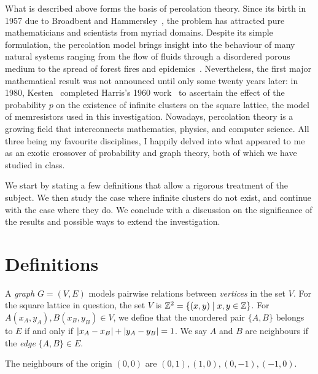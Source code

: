 \documentclass[a4paper, 12pt]{article}
\begin{document}
What is described above forms the basis of percolation theory. Since its birth in 1957 due to Broadbent and Hammersley~\autocite*[693]{broadbent_hammersley_1957}, the problem has attracted pure mathematicians and scientists from myriad domains. Despite its simple formulation, the percolation model brings insight into the behaviour of many natural systems ranging from the flow of fluids through a disordered porous medium to the spread of forest fires and epidemics~\autocite[60]{gennes_2000}. Nevertheless, the first major mathematical result was not announced until only some twenty years later: in 1980, Kesten~\autocite*[41]{kesten_1980} completed Harris's 1960 work~\autocite*[13]{harris_1960} to ascertain the effect of the probability $p$ on the existence of infinite clusters on the square lattice, the model of memresistors used in this investigation. Nowadays, percolation theory is a growing field that interconnects mathematics, physics, and computer science. All three being my favourite disciplines, I happily delved into what appeared to me as an exotic crossover of probability and graph theory, both of which we have studied in class.

We start by stating a few definitions that allow a rigorous treatment of the subject. We then study the case where infinite clusters do not exist, and continue with the case where they do. We conclude with a discussion on the significance of the results and possible ways to extend the investigation.

\section{Definitions}\label{sec:prelims}
\begin{defn}\label{def:graph}
    A \textit{graph} $G = (V, E)$ models pairwise relations between \textit{vertices} in the set $V$. For the square lattice in question, the set $V$ is $\mathbb{Z}^2 = \{(x, y) \mid x, y \in \mathbb{Z}\}$. For $A(x_A, y_A), B(x_B, y_B) \in V$, we define that the unordered pair $\{A, B\}$ belongs to $E$ if and only if $\lvert x_A - x_B \rvert + \lvert y_A - y_B \rvert = 1$. We say $A$ and $B$ are neighbours if the \textit{edge} $\{A, B\} \in E$.
\end{defn}
\begin{ex*}\vspace{-0.01cm}
    The neighbours of the origin $(0, 0)$ are $(0, 1), (1, 0), (0, -1), (-1, 0)$.
    
\end{ex*}
\end{document}
